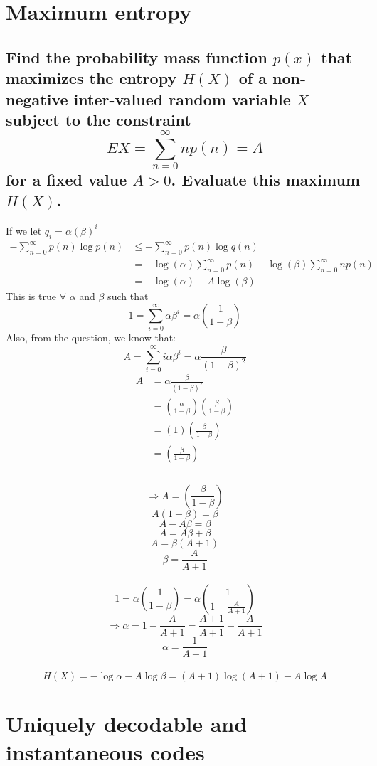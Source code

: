 \documentclass[11pt, oneside]{book}   	%
\begin{document}
\section{Maximum entropy}
\subsection*{Find the probability mass function $p(x)$ that maximizes the entropy $H(X)$ of a non-negative inter-valued random variable $X$ subject to the constraint 
$$EX = \sum_{n=0}^{\infty}np(n) = A$$ 
for a fixed value $A > 0$. Evaluate this maximum $H(X)$.}

If we let $q_i = \alpha(\beta)^i$
\begin{equation}\label{}
\begin{split}
-\sum_{n=0}^{\infty}p(n) \log p(n) & \leq -\sum_{n=0}^{\infty}p(n) \log q(n) \\
& = - \log(\alpha)\sum_{n=0}^{\infty}p(n) - \log(\beta)\sum_{n=0}^{\infty}np(n) \\
& = - \log (\alpha) - A \log (\beta)
\end{split}
\end{equation}
This is true $\forall$ $\alpha$ and $\beta$ such that
$$1 = \sum_{i=0}^{\infty}\alpha\beta^i = \alpha(\frac{1}{1-\beta})$$
Also, from the question, we know that:
$$A = \sum_{i=0}^{\infty}i\alpha\beta^i = \alpha\frac{\beta}{(1-\beta)^2} $$
\begin{equation}\label{}
\begin{split}
A & = \alpha\frac{\beta}{(1-\beta)^2} \\
& = (\frac{\alpha}{1-\beta}) (\frac{\beta}{1-\beta}) \\
& = (1)(\frac{\beta}{1-\beta}) \\
& = (\frac{\beta}{1-\beta}) \\
\end{split}
\end{equation}\\
$$\Rightarrow A = (\frac{\beta}{1-\beta})$$
$$A(1-\beta) = \beta$$
$$A-A\beta = \beta$$
$$A = A\beta + \beta$$
$$A = \beta(A + 1)$$
$$\beta = \frac{A}{A+1}$$\\
$$1 = \alpha(\frac{1}{1-\beta}) = \alpha(\frac{1}{1-\frac{A}{A+1}})$$
$$\Rightarrow \alpha = 1-\frac{A}{A+1} = \frac{A+1}{A+1} - \frac{A}{A+1}$$
$$\alpha=\frac{1}{A+1}$$\\
$$H(X) = - \log \alpha - A \log \beta = (A+1)\log(A+1) - A \log A$$

\section{Uniquely decodable and instantaneous codes}
\end{document}

